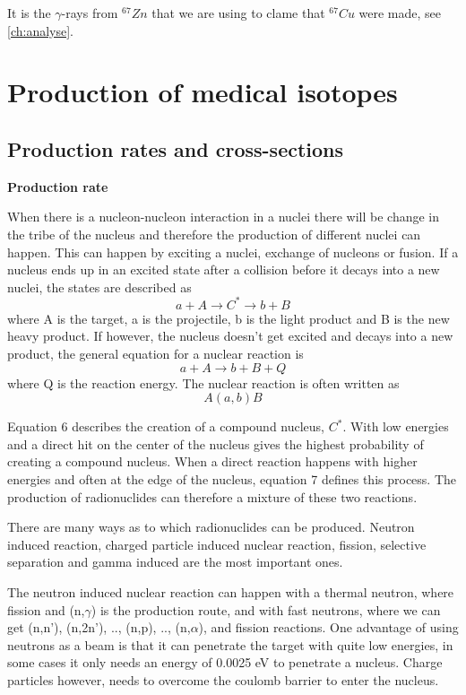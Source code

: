 \documentclass[twoside,english]{uiofysmaster/uiofysmaster}
\begin{document}
It is the $\gamma$-rays from $^{67}Zn$ that we are using to clame that $^{67}Cu$ were made, see \ref{ch:analyse}.


\section{Production of medical isotopes}
\subsection{Production rates and cross-sections}
\noindent
\textbf{Production rate}

When there is a nucleon-nucleon interaction in a nuclei there will be change in the tribe of the nucleus and therefore the production of different nuclei can happen. This can happen by exciting a nuclei, exchange of nucleons or fusion. \cite{nuclearchem}
If a nucleus ends up in an excited state after a collision before it decays into a new nuclei, the states are described as \begin{equation}
    a + A \rightarrow C^* \rightarrow b + B 
\end{equation} \cite{nuclearchem}
where A is the target, a is the projectile, b is the light product and B is the new heavy product. If however, the nucleus doesn't get excited and decays into a new product, the general equation for a nuclear reaction is
\begin{equation}
    a + A \rightarrow b + B + Q 
\end{equation}
where Q is the reaction energy. The nuclear reaction is often written as \begin{equation}
A(a,b)B
\end{equation}


Equation 6 describes the creation of a compound nucleus, $C^*$. With low energies and a direct hit on the center of the nucleus gives the highest probability of creating a compound nucleus. When a direct reaction happens with higher energies and often at the edge of the nucleus, equation 7 defines this process\cite{Nuclear_medicine}. The production of radionuclides can therefore a mixture of these two reactions.


There are many ways as to which radionuclides can be produced. Neutron induced reaction, charged particle induced nuclear reaction, fission, selective separation and gamma induced are the most important ones\cite{Nuclear_medicine}.

The neutron induced nuclear reaction can happen with a thermal neutron, where fission and (n,$\gamma$) is the production route, and with fast neutrons, where we can get (n,n'), (n,2n'), .., (n,p), .., (n,$\alpha$), and fission reactions. One advantage of using neutrons as a beam is that it can penetrate the target with quite low energies, in some cases it only needs an energy of 0.0025 eV to penetrate a nucleus\cite{Nuclear_medicine}. Charge particles however, needs to overcome the coulomb barrier to enter the nucleus. 
\end{document}
